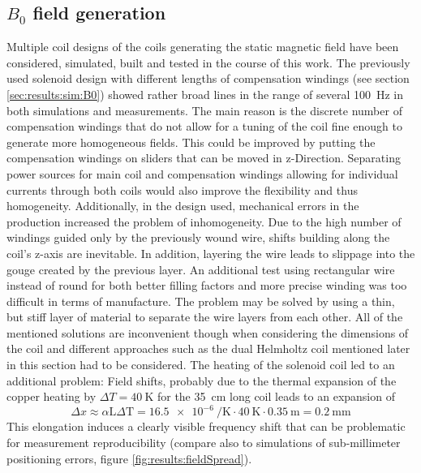         \subsection{$B_0$ field generation}
        Multiple coil designs of the coils generating the static magnetic field have been considered, simulated, built and tested in the course of this work. The previously used solenoid design with different lengths of compensation windings (see section \ref{sec:results:sim:B0}) showed rather broad lines in the range of several \SI{100}{\hertz} in both simulations and measurements. The main reason is the discrete number of compensation windings that do not allow for a tuning of the coil fine enough to generate more homogeneous fields. This could be improved by putting the compensation windings on sliders that can be moved in z-Direction. Separating power sources for main coil and compensation windings allowing for individual currents through both coils would also improve the flexibility and thus homogeneity. Additionally, in the design used, mechanical errors in the production increased the problem of inhomogeneity. Due to the high number of windings guided only by the previously wound wire, shifts building along the coil's z-axis are inevitable. In addition, layering the wire leads to slippage into the gouge created by the previous layer. An additional test using rectangular wire instead of round for both better filling factors and more precise winding was too difficult in terms of manufacture. The problem may be solved by using a thin, but stiff layer of material to separate the wire layers from each other. All of the mentioned solutions are inconvenient though when considering the dimensions of the coil and different approaches such as the dual Helmholtz coil mentioned later in this section had to be considered.
            The heating of the solenoid coil led to an additional problem: Field shifts, probably due to the thermal expansion of the copper heating by $\Delta T = \SI{40}{\kelvin}$ for the \SI{35}{\centi\meter} long coil leads to an expansion of 
            \begin{equation}
                \Delta x \approx \alpha \mathrm{L}\Delta\mathrm{T}= \SI{16.5e-6}{\per\kelvin}\cdot \SI{40}{\kelvin} \cdot \SI{0.35}{\meter} = \SI{0.2}{\milli\meter}
            \end{equation}
            This elongation induces a clearly visible frequency shift that can be problematic for measurement reproducibility (compare also to simulations of sub-millimeter positioning errors, figure \ref{fig:results:fieldSpread}).
